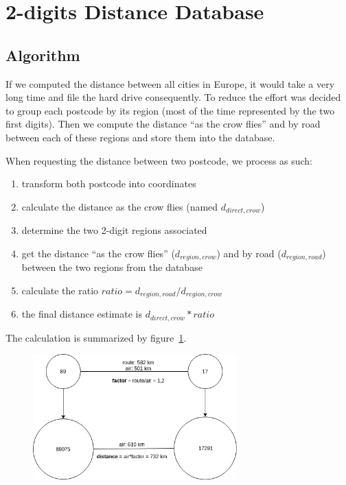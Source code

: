 
\section{2-digits Distance Database}

\subsection{Algorithm}

If we computed the distance between all cities in Europe, it would take a very
long time and file the hard drive consequently.
To reduce the effort was decided to group each postcode by its region (most of the
time represented by the two first digits). Then we compute the distance ``as the
crow flies'' and by road between each of these regions and store them into the database.

When requesting the distance between two postcode, we process as such:
\begin{enumerate}
  \item transform both postcode into coordinates
  \item calculate the distance as the crow flies (named $d_{direct,crow}$)
  \item determine the two 2-digit regions associated
  \item get the distance ``as the crow flies'' ($d_{region,crow}$) and by road
      ($d_{region,road}$) between the two regions from the database
  \item calculate the ratio $ratio = d_{region,road}/d_{region,crow}$
  \item the final distance estimate is $d_{direct,crow} * ratio$
\end{enumerate}

The calculation is summarized by figure~\ref{fig:calc}.
\begin{figure}[H]
\centering
\includegraphics[width=0.7\textwidth]{img/calc}
\label{fig:calc}
\end{figure}
